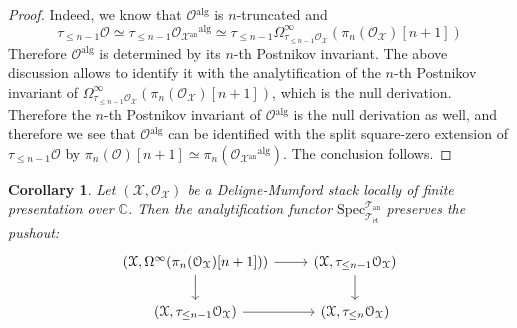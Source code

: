 \documentclass[12pt,a4paper,reqno]{amsart}
\theoremstyle{plain}
\newtheorem{cor}[thm]{Corollary}
\theoremstyle{definition}
\theoremstyle{remark}
\numberwithin{equation}{section}
\begin{document}
\begin{proof}
	Indeed, we know that ${\mathcal O}{^\mathrm{alg}}$ is $n$-truncated and
	\[ \tau_{\le n - 1} {\mathcal O} \simeq \tau_{\le n - 1} {\mathcal O}_{{\mathcal X}{^\mathrm{an}}}{^\mathrm{alg}} \simeq \tau_{\le n - 1} \Omega^\infty_{\tau_{\le n - 1} {\mathcal O}_{\mathcal X}}(\pi_n({\mathcal O}_{\mathcal X})[n+1]) \]
	Therefore ${\mathcal O}{^\mathrm{alg}}$ is determined by its $n$-th Postnikov invariant.
	The above discussion allows to identify it with the analytification of the $n$-th Postnikov invariant of $\Omega^\infty_{\tau_{\le n - 1} {\mathcal O}_{\mathcal X}}(\pi_n({\mathcal O}_{\mathcal X})[n+1])$, which is the null derivation.
	Therefore the $n$-th Postnikov invariant of ${\mathcal O}{^\mathrm{alg}}$ is the null derivation as well, and therefore we see that ${\mathcal O}{^\mathrm{alg}}$ can be identified with the split square-zero extension of $\tau_{\le n - 1} {\mathcal O}$ by $\pi_n({\mathcal O})[n+1] \simeq \pi_n({\mathcal O}_{{\mathcal X}{^\mathrm{an}}}{^\mathrm{alg}})$.
	The conclusion follows.
\end{proof}
	
\begin{cor}
	Let $({\mathcal X}, {\mathcal O}_{\mathcal X})$ be a {Deligne-Mumford\xspace} stack locally of finite presentation over $\mathbb C$.
	Then the analytification functor ${\mathrm{Spec}^{{\mathcal T}_{\mathrm{an}}}_{{\mathcal T}_{\mathrm{\acute{e}t}}}}$ preserves the pushout:
	\[ \begin{tikzcd}
		({\mathcal X}, \Omega^\infty(\pi_n({\mathcal O}_{\mathcal X})[n+1])) \arrow{r} \arrow{d} & ({\mathcal X}, \tau_{\le n - 1} {\mathcal O}_{\mathcal X}) \arrow{d} \\
		({\mathcal X}, \tau_{\le n - 1} {\mathcal O}_{\mathcal X}) \arrow{r} & ({\mathcal X}, \tau_{\le n} {\mathcal O}_{\mathcal X})
	\end{tikzcd} \]
\end{cor}
	
\end{document}
